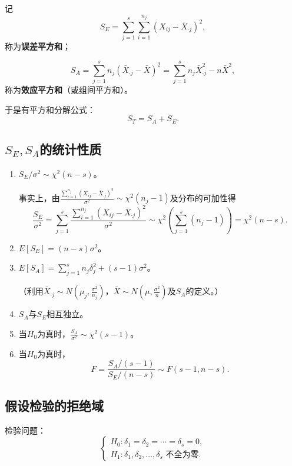 \documentclass[11pt,a4paper]{report}
\theoremstyle{definition}
\begin{document}
记
\[
S_{E}=\sum_{j=1}^{s}\sum_{i=1}^{n_{j}}(X_{ij}-\bar{X}_{\cdot j})^{2},
\]
称为\textbf{误差平方和}；

\[
S_{A}=\sum_{j=1}^{s}n_{j}(\bar{X}_{\cdot j}-\bar{X})^{2}=\sum_{j=1}^{s}n_{j}\bar{X}_{\cdot j}^{2}-n\bar{X}^{2},
\]
称为\textbf{效应平方和}（或组间平方和）。

于是有平方和分解公式：
\[
S_{T}=S_{A}+S_{E}.
\]

\subsection{\texorpdfstring{$S_{E},S_{A}$}{SE,SA}的统计性质}

\begin{enumerate}[label=(\arabic*),leftmargin=2em]
    \item $S_{E}/\sigma^{2}\sim\chi^{2}(n-s)$。
    
    事实上，由$\displaystyle\frac{\sum_{i=1}^{n_{j}}(X_{ij}-\bar{X}_{\cdot j})^{2}}{\sigma^{2}}\sim\chi^{2}(n_{j}-1)$及分布的可加性得
    \[
    \frac{S_{E}}{\sigma^{2}}=\sum_{j=1}^{s}\frac{\sum_{i=1}^{n_{j}}(X_{ij}-\bar{X}_{\cdot j})^{2}}{\sigma^{2}}\sim\chi^{2}\left(\sum_{j=1}^{s}(n_{j}-1)\right)=\chi^{2}(n-s).
    \]
    
    \item $E[S_{E}]=(n-s)\sigma^{2}$。
    
    \item $E[S_{A}]=\displaystyle\sum_{j=1}^{s}n_{j}\delta_{j}^{2}+(s-1)\sigma^{2}$。
    
    （利用$\bar{X}_{\cdot j}\sim N\!\left(\mu_{j},\frac{\sigma^{2}}{n_{j}}\right)$，$\bar{X}\sim N\!\left(\mu,\frac{\sigma^{2}}{n}\right)$及$S_{A}$的定义。）
    
    \item $S_{A}$与$S_{E}$相互独立。
    
    \item 当$H_{0}$为真时，$\displaystyle\frac{S_{A}}{\sigma^{2}}\sim\chi^{2}(s-1)$。
    
    \item 当$H_{0}$为真时，
    \[
    F=\frac{S_{A}/(s-1)}{S_{E}/(n-s)}\sim F(s-1,n-s).
    \]
\end{enumerate}

\subsection{假设检验的拒绝域}

检验问题：
\[
\begin{cases}
H_{0}\colon\delta_{1}=\delta_{2}=\cdots=\delta_{s}=0,\\[0.3em]
H_{1}\colon\delta_{1},\delta_{2},\ldots,\delta_{s}\text{ 不全为零}.
\end{cases}
\]
\end{document}
